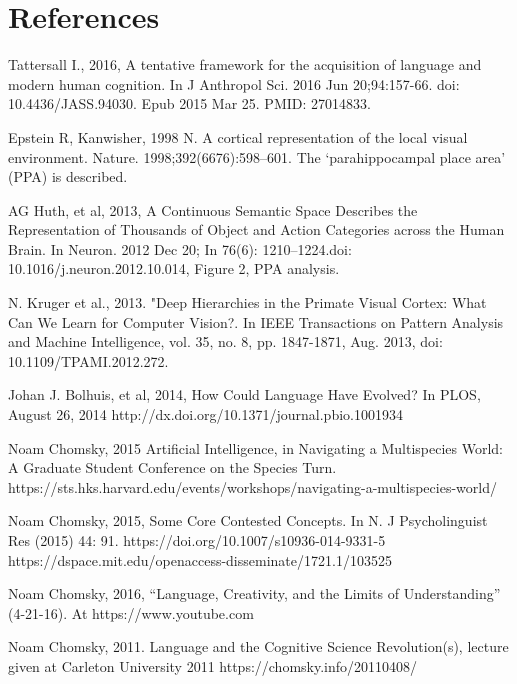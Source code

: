 \documentclass{clv3}
\begin{document}
\section{References}
\begin{unenumerate}

\item Tattersall I., 2016, A tentative framework for the acquisition of language and modern human cognition. In J Anthropol Sci. 2016 Jun 20;94:157-66. doi: 10.4436/JASS.94030. Epub 2015 Mar 25. PMID: 27014833.


\item Epstein R, Kanwisher, 1998 N. A cortical representation of the local visual environment. Nature. 1998;392(6676):598–601.  The ‘parahippocampal place area’ (PPA) is described.

\item AG Huth, et al,  2013, A Continuous Semantic Space Describes the Representation of Thousands of Object and Action Categories across the Human Brain.  In Neuron. 2012 Dec 20; In 76(6): 1210–1224.doi: 10.1016/j.neuron.2012.10.014, Figure 2, PPA analysis.


\item N. Kruger et al., 2013. "Deep Hierarchies in the Primate Visual Cortex: What Can We Learn for Computer Vision?.   In IEEE Transactions on Pattern Analysis and Machine Intelligence, vol. 35, no. 8, pp. 1847-1871, Aug. 2013, doi: 10.1109/TPAMI.2012.272.


\item Johan J. Bolhuis, et al, 2014,  How Could Language Have Evolved?  In PLOS, August 26, 2014  http://dx.doi.org/10.1371/journal.pbio.1001934

  
\item Noam Chomsky, 2015 Artificial Intelligence, in Navigating a Multispecies World: A Graduate Student Conference on the Species Turn.  https://sts.hks.harvard.edu/events/workshops/navigating-a-multispecies-world/

\item  Noam Chomsky, 2015, Some Core Contested Concepts. In N. J Psycholinguist Res (2015) 44: 91. https://doi.org/10.1007/s10936-014-9331-5 https://dspace.mit.edu/openaccess-disseminate/1721.1/103525

  
\item Noam Chomsky, 2016, “Language, Creativity, and the Limits of Understanding” (4-21-16). At https://www.youtube.com 

\item Noam Chomsky, 2011.  Language and the Cognitive Science Revolution(s),  lecture given at Carleton University 2011  https://chomsky.info/20110408/



\end{unenumerate}
\end{document}
